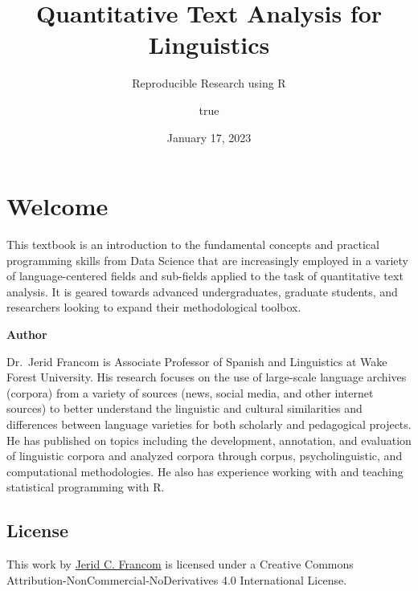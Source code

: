 \documentclass[
  letterpaper,
]{latex/krantz}
\title{Quantitative Text Analysis for Linguistics}
\subtitle{Reproducible Research using R}
\author{true}
\date{January 17, 2023}
\renewcommand*\contentsname{Table of contents}
\newcommand\contentsname{Table of contents}
\begin{document}
\maketitle
\ifdefined\Shaded\renewenvironment{Shaded}{\begin{tcolorbox}[enhanced, colback={shadecolor}, boxrule=0pt, frame hidden, breakable]}{\end{tcolorbox}}\fi

\renewcommand*\contentsname{Table of contents}
{
\hypersetup{linkcolor=}
\setcounter{tocdepth}{2}
\tableofcontents
}

\hypertarget{welcome}{%
\chapter*{Welcome}\label{welcome}}


This textbook is an introduction to the fundamental concepts and
practical programming skills from Data Science that are increasingly
employed in a variety of language-centered fields and sub-fields applied
to the task of quantitative text analysis. It is geared towards advanced
undergraduates, graduate students, and researchers looking to expand
their methodological toolbox.

\textbf{Author}

Dr.~Jerid Francom is Associate Professor of Spanish and Linguistics at
Wake Forest University. His research focuses on the use of large-scale
language archives (corpora) from a variety of sources (news, social
media, and other internet sources) to better understand the linguistic
and cultural similarities and differences between language varieties for
both scholarly and pedagogical projects. He has published on topics
including the development, annotation, and evaluation of linguistic
corpora and analyzed corpora through corpus, psycholinguistic, and
computational methodologies. He also has experience working with and
teaching statistical programming with R.

\hypertarget{license}{%
\section*{License}\label{license}}


This work by \href{https://francojc.github.io/}{Jerid C. Francom} is
licensed under a Creative Commons
Attribution-NonCommercial-NoDerivatives 4.0 International License.
\end{document}
